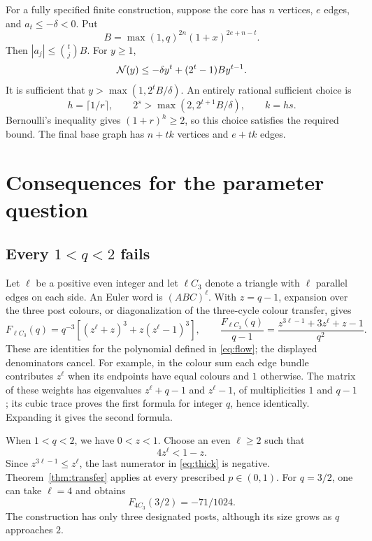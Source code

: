 \documentclass[11pt,a4paper]{article}
\theoremstyle{remark}\newtheorem{remark}[theorem]{Remark}
\begin{document}
For a fully specified finite construction, suppose the core has $n$ vertices, $e$ edges, and $a_t\le-\delta<0$. Put
\begin{equation}\label{eq:Bamp}
B=\max(1,q)^{2n}(1+x)^{2e+n-t}.
\end{equation}
Then $|a_j|\le\binom tj B$. For $y\ge1$,
\[
\mathcal N(y)\le-\delta y^t+(2^t-1)By^{t-1}.
\]
It is sufficient that $y>\max(1,2^tB/\delta)$. An entirely rational sufficient choice is
\begin{equation}\label{eq:ks}
h=\lceil1/r\rceil,\qquad
2^s>\max(2,2^{t+1}B/\delta),\qquad k=hs.
\end{equation}
Bernoulli's inequality gives $(1+r)^h\ge2$, so this choice satisfies the required bound. The final base graph has $n+tk$ vertices and $e+tk$ edges.

\section{Consequences for the parameter question}
\subsection{Every $1<q<2$ fails}
Let $\ell$ be a positive even integer and let $\ell C_3$ denote a triangle with $\ell$ parallel edges on each side. An Euler word is $(ABC)^\ell$. With $z=q-1$, expansion over the three post colours, or diagonalization of the three-cycle colour transfer, gives
\begin{equation}\label{eq:thick}
F_{\ell C_3}(q)=q^{-3}\left[(z^\ell+z)^3+z(z^\ell-1)^3\right],
\qquad
\frac{F_{\ell C_3}(q)}{q-1}
=\frac{z^{3\ell-1}+3z^\ell+z-1}{q^2}.
\end{equation}
These are identities for the polynomial defined in \eqref{eq:flow}; the displayed denominators cancel. For example, in the colour sum each edge bundle contributes $z^\ell$ when its endpoints have equal colours and $1$ otherwise. The matrix of these weights has eigenvalues $z^\ell+q-1$ and $z^\ell-1$, of multiplicities $1$ and $q-1$; its cubic trace proves the first formula for integer $q$, hence identically. Expanding it gives the second formula.

When $1<q<2$, we have $0<z<1$. Choose an even $\ell\ge2$ such that
\[
4z^\ell<1-z.
\]
Since $z^{3\ell-1}\le z^\ell$, the last numerator in \eqref{eq:thick} is negative. Theorem~\ref{thm:transfer} applies at every prescribed $p\in(0,1)$. For $q=3/2$, one can take $\ell=4$ and obtains
\[
F_{4C_3}(3/2)=-71/1024.
\]
The construction has only three designated posts, although its size grows as $q$ approaches $2$.
\end{document}

